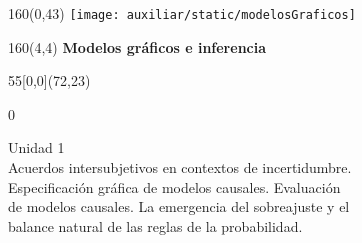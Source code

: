 \documentclass[shownotes,aspectratio=169]{beamer}
\begin{document}
\color{black!85}
\large
%
%
%
%
%
%


\begin{frame}
\begin{textblock}{160}(0,43)
\texttt{[image: auxiliar/static/modelosGraficos]}
\end{textblock}


\begin{textblock}{160}(4,4)
\LARGE \textcolor{black!85}{\fontsize{22}{0}\selectfont \textbf{Modelos gráficos e inferencia}}
\end{textblock}


\begin{textblock}{55}[0,0](72,23)
\begin{turn}{0}
\parbox{10cm}{\sloppy\setlength\parfillskip{0pt}
\textcolor{black!85}{Unidad 1} \\
\small\textcolor{black!85}{Acuerdos intersubjetivos en contextos de incertidumbre.} \\
\small\textcolor{black!85}{Especificación gráfica de modelos causales. Evaluación} \\
\small\textcolor{black!85}{de modelos causales. La emergencia del sobreajuste y el} \\
\small\textcolor{black!85}{balance natural de las reglas de la probabilidad.} \\
}
\end{turn}
\end{textblock}

\end{frame}
\end{document}
